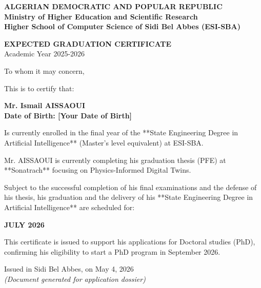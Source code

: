 \documentclass[12pt,a4paper]{article}
\begin{document}
\begin{center}
    \textbf{\Large ALGERIAN DEMOCRATIC AND POPULAR REPUBLIC} \\
    \textbf{Ministry of Higher Education and Scientific Research} \\
    \medskip
    \textbf{Higher School of Computer Science of Sidi Bel Abbes (ESI-SBA)}
\end{center}

\bigskip
\bigskip

\begin{center}
    {\Huge \textbf{\color{primary} EXPECTED GRADUATION CERTIFICATE}} \\
    \medskip
    {\large Academic Year 2025-2026}
\end{center}

\bigskip
\bigskip

\noindent To whom it may concern,

\bigskip

\noindent This is to certify that:

\bigskip

\begin{center}
    {\Large \textbf{Mr. Ismail AISSAOUI}} \\
    \textbf{Date of Birth: [Your Date of Birth]} \\
\end{center}

\bigskip

\noindent Is currently enrolled in the final year of the **State Engineering Degree in Artificial Intelligence** (Master's level equivalent) at ESI-SBA.

\bigskip

\noindent Mr. AISSAOUI is currently completing his graduation thesis (PFE) at **Sonatrach** focusing on Physics-Informed Digital Twins.

\bigskip

\noindent Subject to the successful completion of his final examinations and the defense of his thesis, his graduation and the delivery of his **State Engineering Degree in Artificial Intelligence** are scheduled for:

\bigskip

\begin{center}
    {\huge \textbf{JULY 2026}}
\end{center}

\bigskip

\noindent This certificate is issued to support his applications for Doctoral studies (PhD), confirming his eligibility to start a PhD program in September 2026.

\bigskip
\bigskip

\begin{flushright}
    Issued in Sidi Bel Abbes, on May 4, 2026 \\
    \bigskip
    \textit{(Document generated for application dossier)}
\end{flushright}
\end{document}
